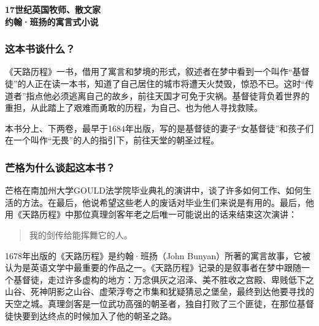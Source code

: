 \cleardoublepage
{}


\begin{BookSummaryBox}
{\centering \textbf{17世纪英国牧师、散文家\\ 约翰·班扬的寓言式小说}\par}
\end{BookSummaryBox}

\subsubsection*{这本书谈什么？}

《天路历程》一书，借用了寓言和梦境的形式，叙述者在梦中看到一个叫作“基督徒”的人正在读一本书，知道了自己居住的城市将遭天火焚毁，惊恐不已。这时“传道者”指点他必须逃离自己的故乡，前往天国才可免于灾祸。基督徒背负着世界的重担，从此踏上了艰难而勇敢的历程，为自己、也为他人寻找救赎。
\par

本书分上、下两卷，最早于1684年出版，写的是基督徒的妻子“女基督徒”和孩子们在一个叫作“无畏”的人的指引下，前往天堂的朝圣过程。
\par

\subsubsection*{芒格为什么谈起这本书？}

芒格在南加州大学GOULD法学院毕业典礼的演讲中，谈了许多如何工作、如何生活的方法。在最后，他说希望这些老人的废话对毕业生们来说是有用的。最后，他用《天路历程》中那位真理剑客年老之后唯一可能说出的话来结束这次演讲：
\par

\begin{quotation}
我的剑传给能挥舞它的人。
\par
\end{quotation}

1678年出版的《天路历程》是约翰·班扬（John Bunyan）所著的寓言故事，它被认为是英语文学中最重要的作品之一。《天路历程》记录的是叙事者在梦中跟随一个基督徒，走过许多虚构的地方：万念俱灰之沼泽、美不胜收之宫殿、卑贱低下之山谷、死神阴影之山谷、虚荣浮夸之市集和犹疑猜忌之堡垒，最终到达他要寻找的天空之城。真理剑客是一位武功高强的朝圣者，独自打败了三个匪徒，在那位基督徒快要到达终点的时候加入了他的朝圣之路。
\par

